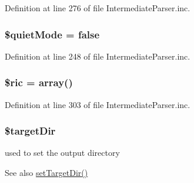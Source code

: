 \-Definition at line 276 of file \-Intermediate\-Parser.\-inc.

\hypertarget{classphp_documentor___intermediate_parser_a7b06630dd83a1912cca52476a5438f9e}{
\subsubsection[{\$quiet\-Mode}]{\setlength{\rightskip}{0pt plus 5cm}\$quiet\-Mode = false}}\label{classphp_documentor___intermediate_parser_a7b06630dd83a1912cca52476a5438f9e}


\-Definition at line 248 of file \-Intermediate\-Parser.\-inc.

\hypertarget{classphp_documentor___intermediate_parser_a98207a9960bf351c0d6feea077664b4f}{
\subsubsection[{\$ric}]{\setlength{\rightskip}{0pt plus 5cm}\$ric = array()}}\label{classphp_documentor___intermediate_parser_a98207a9960bf351c0d6feea077664b4f}


\-Definition at line 303 of file \-Intermediate\-Parser.\-inc.

\hypertarget{classphp_documentor___intermediate_parser_aae33ae3051c6f350bb69a0631ade81d9}{
\subsubsection[{\$target\-Dir}]{\setlength{\rightskip}{0pt plus 5cm}\$target\-Dir}}\label{classphp_documentor___intermediate_parser_aae33ae3051c6f350bb69a0631ade81d9}
used to set the output directory \begin{DoxySeeAlso}{\-See also}
\hyperlink{classphp_documentor___intermediate_parser_a07611111094b2954729773f6436a0fe1}{set\-Target\-Dir()} 
\end{DoxySeeAlso}


